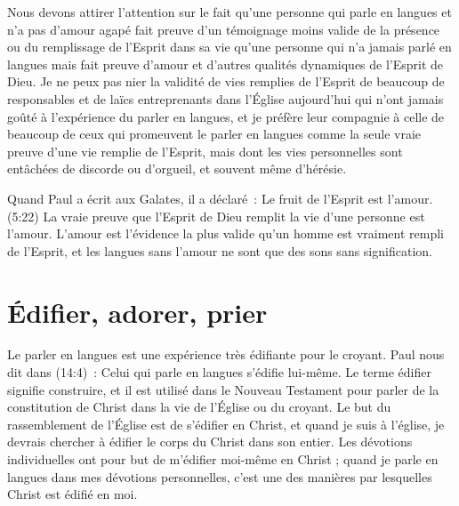 Nous devons attirer l'attention sur le fait qu'une personne qui parle
 en langues et n'a pas d'amour agapé fait preuve d'un témoignage
 moins valide de la présence ou du remplissage de l'Esprit dans sa vie
 qu'une personne qui n'a jamais parlé en langues mais fait preuve d'amour
 et d'autres qualités dynamiques de l'Esprit de Dieu.
 Je ne peux pas nier la validité de vies remplies de l'Esprit de beaucoup
 de responsables et de laïcs entreprenants dans l'Église aujourd'hui
 qui n'ont jamais goûté à l'expérience du parler en langues,
 et je préfère leur compagnie à celle de beaucoup de ceux qui promeuvent
 le parler en langues comme la seule vraie preuve d'une vie remplie
 de l'Esprit, mais dont les vies personnelles sont entâchées de discorde
 ou d'orgueil, et souvent même d'hérésie.

Quand Paul a écrit aux Galates, il a déclaré~:
 \og Le fruit de l'Esprit est l'amour. \fg{}(5:22)
 La vraie preuve que l'Esprit de Dieu remplit la vie d'une personne
 est l'amour. L'amour est l'évidence la plus valide qu'un homme
 est vraiment rempli de l'Esprit, et les langues sans l'amour
 ne sont que des sons sans signification.


\section{\'Edifier, adorer, prier}

Le parler en langues est une expérience très édifiante pour le croyant.
 Paul nous dit dans (14:4)~:
 \og Celui qui parle en langues s'édifie lui-même. \fg{}
 Le terme \og édifier \fg{} signifie construire, et il est utilisé
 dans le Nouveau Testament pour parler de la constitution de Christ
 dans la vie de l'Église ou du croyant. Le but du rassemblement de l'Église
 est de s'édifier en Christ, et quand je suis à l'église,
 je devrais chercher à édifier le corps du Christ dans son entier.
 Les dévotions individuelles ont pour but de m'édifier moi-même en Christ ;
 quand je parle en langues dans mes dévotions personnelles,
 c'est une des manières par lesquelles Christ est édifié en moi.

